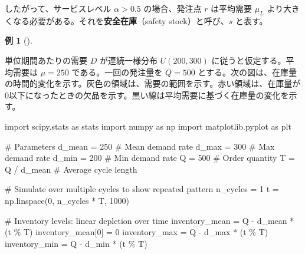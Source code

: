 \documentclass[
  japanese,
  letterpaper,
]{ltjbook}
\newenvironment{Shaded}{\begin{snugshade}}{\end{snugshade}}
\newcommand{\CommentTok}[1]{\textcolor[rgb]{0.37,0.37,0.37}{#1}}
\newcommand{\DecValTok}[1]{\textcolor[rgb]{0.68,0.00,0.00}{#1}}
\newcommand{\ImportTok}[1]{\textcolor[rgb]{0.00,0.46,0.62}{#1}}
\newcommand{\NormalTok}[1]{\textcolor[rgb]{0.00,0.23,0.31}{#1}}
\newcommand{\OperatorTok}[1]{\textcolor[rgb]{0.37,0.37,0.37}{#1}}
\theoremstyle{plain}
\theoremstyle{definition}
\newtheorem{example}{例}[chapter]
\theoremstyle{remark}
\begin{document}
したがって、サービスレベル \(\alpha > 0.5\) の場合、発注点 \(r\)
は平均需要 \(\mu_L\)
より大きくなる必要がある。それを\textbf{安全在庫}（safety
stock）と呼び、\(s\) と表す。

\begin{example}[]\protect\hypertarget{exm-safety-stock-unified}{}\label{exm-safety-stock-unified}

単位期間あたりの需要 \(D\) が連続一様分布 \(U(200, 300)\)
に従うと仮定する。平均需要は \(\mu = 250\) である。一回の発注量を
\(Q = 500\)
とする。次の図は、在庫量の時間的変化を示す。灰色の領域は、需要の範囲を示す。赤い領域は、在庫量が0以下になったときの欠品を示す。黒い線は平均需要に基づく在庫量の変化を示す。

\begin{Shaded}
\begin{Highlighting}[]
\ImportTok{import}\NormalTok{ scipy.stats }\ImportTok{as}\NormalTok{ stats}
\ImportTok{import}\NormalTok{ numpy }\ImportTok{as}\NormalTok{ np}
\ImportTok{import}\NormalTok{ matplotlib.pyplot }\ImportTok{as}\NormalTok{ plt}

\CommentTok{\# Parameters}
\NormalTok{d\_mean }\OperatorTok{=} \DecValTok{250}  \CommentTok{\# Mean demand rate}
\NormalTok{d\_max }\OperatorTok{=} \DecValTok{300}   \CommentTok{\# Max demand rate}
\NormalTok{d\_min }\OperatorTok{=} \DecValTok{200}   \CommentTok{\# Min demand rate}
\NormalTok{Q }\OperatorTok{=} \DecValTok{500}       \CommentTok{\# Order quantity}
\NormalTok{T }\OperatorTok{=}\NormalTok{ Q }\OperatorTok{/}\NormalTok{ d\_mean  }\CommentTok{\# Average cycle length}

\CommentTok{\# Simulate over multiple cycles to show repeated pattern}
\NormalTok{n\_cycles }\OperatorTok{=} \DecValTok{1}
\NormalTok{t }\OperatorTok{=}\NormalTok{ np.linspace(}\DecValTok{0}\NormalTok{, n\_cycles }\OperatorTok{*}\NormalTok{ T, }\DecValTok{1000}\NormalTok{)}

\CommentTok{\# Inventory levels: linear depletion over time}
\NormalTok{inventory\_mean }\OperatorTok{=}\NormalTok{ Q }\OperatorTok{{-}}\NormalTok{ d\_mean }\OperatorTok{*}\NormalTok{ (t }\OperatorTok{\%}\NormalTok{ T)}
\NormalTok{inventory\_mean[}\DecValTok{0}\NormalTok{] }\OperatorTok{=} \DecValTok{0}
\NormalTok{inventory\_max }\OperatorTok{=}\NormalTok{ Q }\OperatorTok{{-}}\NormalTok{ d\_max }\OperatorTok{*}\NormalTok{ (t }\OperatorTok{\%}\NormalTok{ T)}
\NormalTok{inventory\_min }\OperatorTok{=}\NormalTok{ Q }\OperatorTok{{-}}\NormalTok{ d\_min }\OperatorTok{*}\NormalTok{ (t }\OperatorTok{\%}\NormalTok{ T)}


\end{Highlighting}
\end{Shaded}
\end{example}
\end{document}
